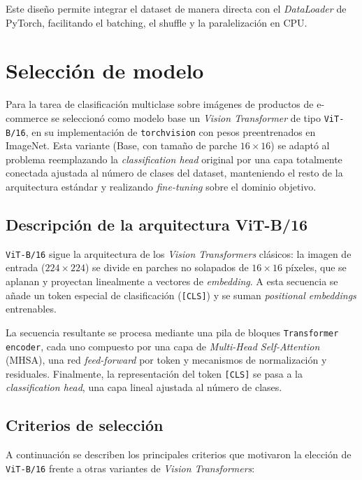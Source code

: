 Este diseño permite integrar el dataset de manera directa con el \textit{DataLoader} de PyTorch, facilitando el batching, el shuffle y la paralelización en CPU.

\section{Selección de modelo}

Para la tarea de clasificación multiclase sobre imágenes de productos de e-commerce se seleccionó como modelo base un \textit{Vision Transformer} de tipo \texttt{ViT-B/16}, en su implementación de \texttt{torchvision} con pesos preentrenados en ImageNet. Esta variante (Base, con tamaño de parche $16 \times 16$) se adaptó al problema reemplazando la \textit{classification head} original por una capa totalmente conectada ajustada al número de clases del dataset, manteniendo el resto de la arquitectura estándar y realizando \textit{fine-tuning} sobre el dominio objetivo.

\subsection{Descripción de la arquitectura ViT-B/16}

\texttt{ViT-B/16} sigue la arquitectura de los \textit{Vision Transformers} clásicos: la imagen de entrada ($224 \times 224$) se divide en parches no solapados de $16 \times 16$ píxeles, que se aplanan y proyectan linealmente a vectores de \textit{embedding}. A esta secuencia se añade un token especial de clasificación (\texttt{[CLS]}) y se suman \textit{positional embeddings} entrenables.

La secuencia resultante se procesa mediante una pila de bloques \texttt{Transformer encoder}, cada uno compuesto por una capa de \textit{Multi-Head Self-Attention} (MHSA), una red \textit{feed-forward} por token y mecanismos de normalización y residuales. Finalmente, la representación del token \texttt{[CLS]} se pasa a la \textit{classification head}, una capa lineal ajustada al número de clases.

\subsection{Criterios de selección}

A continuación se describen los principales criterios que motivaron la elección de \texttt{ViT-B/16} frente a otras variantes de \textit{Vision Transformers}:

